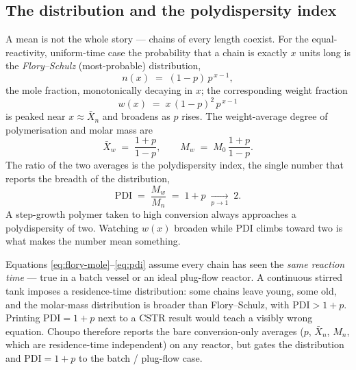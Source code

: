 \documentclass[11pt,a4paper]{article}
\begin{document}
\subsection{The distribution and the polydispersity index}

A mean is not the whole story --- chains of every length coexist.
For the equal-reactivity, uniform-time case the probability that a
chain is exactly $x$ units long is the \emph{Flory--Schulz}
(most-probable) distribution,
\begin{equation}
    n(x) \;=\; (1-p)\,p^{\,x-1},
    \label{eq:flory-mole}
\end{equation}
the mole fraction, monotonically decaying in $x$; the corresponding
weight fraction
\begin{equation}
    w(x) \;=\; x\,(1-p)^2\,p^{\,x-1}
    \label{eq:flory-weight}
\end{equation}
is peaked near $x \approx \bar X_n$ and broadens as $p$ rises.  The
weight-average degree of polymerisation and molar mass are
\begin{equation}
    \bar X_w \;=\; \frac{1+p}{1-p}, \qquad
    M_w \;=\; M_0\,\frac{1+p}{1-p}.
    \label{eq:Mw}
\end{equation}
The ratio of the two averages is the polydispersity index, the single
number that reports the breadth of the distribution,
\begin{equation}
    \boxed{\;\mathrm{PDI} \;=\; \frac{M_w}{M_n} \;=\; 1 + p \;\xrightarrow[p\to1]{}\; 2.\;}
    \label{eq:pdi}
\end{equation}
A step-growth polymer taken to high conversion always approaches a
polydispersity of two.  Watching $w(x)$ broaden while $\mathrm{PDI}$
climbs toward two is what makes the number mean something.

\begin{pitfall}
Equations \eqref{eq:flory-mole}--\eqref{eq:pdi} assume every chain has
seen the \emph{same reaction time} --- true in a batch vessel or an
ideal plug-flow reactor.  A continuous stirred tank imposes a
residence-time distribution: some chains leave young, some old, and
the molar-mass distribution is broader than Flory--Schulz, with
$\mathrm{PDI} > 1+p$.  Printing $\mathrm{PDI} = 1+p$ next to a CSTR
result would teach a visibly wrong equation.  Choupo therefore reports
the bare conversion-only averages ($p$, $\bar X_n$, $M_n$, which are
residence-time independent) on any reactor, but gates the
distribution and $\mathrm{PDI} = 1+p$ to the batch / plug-flow case.
\end{pitfall}
\end{document}
